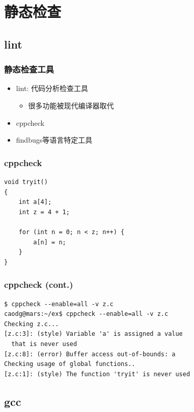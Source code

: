 \documentclass[compress]{beamer}
\begin{document}
\section{静态检查}

\subsection{lint}

\begin{frame}
    \frametitle{静态检查工具}
    \begin{itemize}
        \item lint: 代码分析检查工具
            \begin{itemize}
                \item 很多功能被现代编译器取代
            \end{itemize}
        \item cppcheck
        \item findbugs等语言特定工具
    \end{itemize}
\end{frame}

\begin{frame}[fragile]
    \frametitle{cppcheck}
\begin{lstlisting}
void tryit()
{
    int a[4];
    int z = 4 + 1;

    for (int n = 0; n < z; n++) {
        a[n] = n;
    }
}
\end{lstlisting}

\end{frame}

\begin{frame}[fragile]
\frametitle{cppcheck (cont.)}
\begin{verbatim}
$ cppcheck --enable=all -v z.c
caodg@mars:~/ex$ cppcheck --enable=all -v z.c
Checking z.c...
[z.c:3]: (style) Variable 'a' is assigned a value
  that is never used
[z.c:8]: (error) Buffer access out-of-bounds: a
Checking usage of global functions..
[z.c:1]: (style) The function 'tryit' is never used
\end{verbatim}
\end{frame}


\subsection{gcc}
\end{document}
